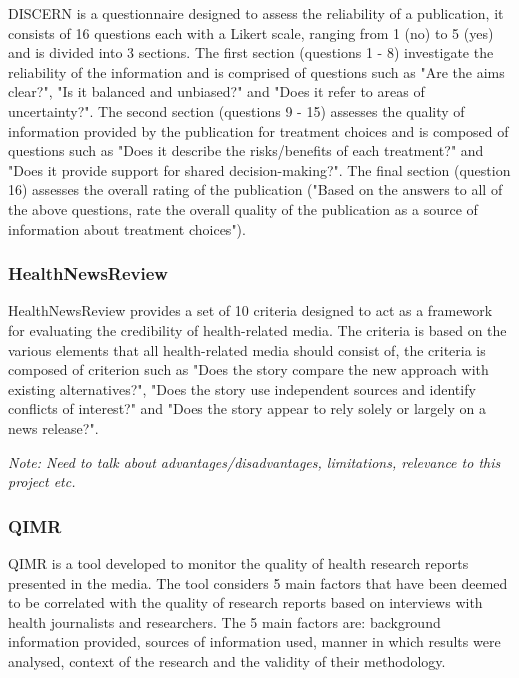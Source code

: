 \documentclass[a4paper,twoside,phd]{BYUPhys}
\begin{document}
DISCERN is a questionnaire designed to assess the reliability of a publication, it consists of 16 questions each with a Likert scale, ranging from 1 (no) to 5 (yes) and is divided into 3 sections. The first section (questions 1 - 8) investigate the reliability of the information and is comprised of questions such as "Are the aims clear?", "Is it balanced and unbiased?" and "Does it refer to areas of uncertainty?". The second section (questions 9 - 15) assesses the quality of information provided by the publication for treatment choices and is composed of questions such as "Does it describe the risks/benefits of each treatment?" and "Does it provide support for shared decision-making?". The final section (question 16) assesses the overall rating of the publication ("Based on the answers to all of the above questions, rate the overall quality of the publication as a source of information about treatment choices").


\subsubsection{HealthNewsReview}
\label{sec:HealthNewsReview}

HealthNewsReview provides a set of 10 criteria designed to act as a framework for evaluating the credibility of health-related media. The criteria is based on the various elements that all health-related media should consist of, the criteria is composed of criterion such as "Does the story compare the new approach with existing alternatives?", "Does the story use independent sources and identify conflicts of interest?" and "Does the story appear to rely solely or largely on a news release?".

\textit{Note: Need to talk about advantages/disadvantages, limitations, relevance to this project etc.}

\subsubsection{QIMR}
\label{sec:QIMR}

QIMR is a tool developed to monitor the quality of health research reports presented in the media. The tool considers 5 main factors that have been deemed to be correlated with the quality of research reports based on interviews with health journalists and researchers. The 5 main factors are: background information provided, sources of information used, manner in which results were analysed, context of the research and the validity of their methodology.
\end{document}
